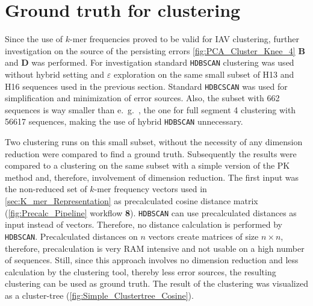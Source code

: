 \section{Ground truth for clustering} \label{sec:Comparison_Clustering}

Since the use of $k$-mer frequencies proved to be valid for \gls{IAV} clustering, further investigation on the source of the persisting errors \autoref{fig:PCA_Cluster_Knee_4} \textbf{\textsf{B}} and \textbf{\textsf{D}} was performed. For investigation standard \texttt{HDBSCAN} clustering was used without hybrid setting and $\varepsilon$ exploration on the same small subset of H13 and H16 sequences used in the previous section. Standard \texttt{HDBCSCAN} was used for simplification and minimization of error sources. Also, the subset with 662 sequences is way smaller than e.~g.~, the one for full segment 4 clustering with 56617 sequences, making the use of hybrid \texttt{HDBSCAN} unnecessary. 

\vspace{1em}

Two clustering runs on this small subset, without the necessity of any dimension reduction were compared to find a ground truth. Subsequently the results were compared to a clustering on the same subset with a simple version of the PK method and, therefore, involvement of dimension reduction. The first input was the non-reduced set of $k$-mer frequency vectors used in \autoref{sec:K_mer_Representation} as precalculated cosine distance matrix (\autoref{fig:Precalc_Pipeline} workflow \textsf{\textbf{8}}). \texttt{HDBSCAN} can use precalculated distances as input instead of vectors. Therefore, no distance calculation is performed by \texttt{HDBSCAN}. Precalculated distances on $n$ vectors create matrices of size $n \times n$, therefore, precalculation is very RAM intensive and not usable on a high number of sequences. Still, since this approach involves no dimension reduction and less calculation by the clustering tool, thereby less error sources, the resulting clustering can be used as ground truth. The result of the clustering was visualized as a cluster-tree (\autoref{fig:Simple_Clustertree_Cosine}). 

